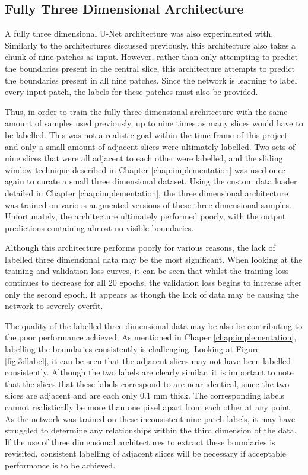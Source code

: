 \subsection{Fully Three Dimensional Architecture}
\label{sec:eval3darch}

A fully three dimensional U-Net architecture was also experimented with. Similarly to the architectures discussed previously, this architecture also takes a chunk of nine patches as input. However, rather than only attempting to predict the boundaries present in the central slice, this architecture attempts to predict the boundaries present in all nine patches. Since the network is learning to label every input patch, the labels for these patches must also be provided.

Thus, in order to train the fully three dimensional architecture with the same amount of samples used previously, up to nine times as many slices would have to be labelled. This was not a realistic goal within the time frame of this project and only a small amount of adjacent slices were ultimately labelled. Two sets of nine slices that were all adjacent to each other were labelled, and the sliding window technique described in Chapter \ref{chap:implementation} was used once again to curate a small three dimensional dataset. Using the custom data loader detailed in Chapter \ref{chap:implementation}, the three dimensional architecture was trained on various augmented versions of these three dimensional samples. Unfortunately, the architecture ultimately performed poorly, with the output predictions containing almost no visible boundaries.

Although this architecture performs poorly for various reasons, the lack of labelled three dimensional data may be the most significant. When looking at the training and validation loss curves, it can be seen that whilst the training loss continues to decrease for all 20 epochs, the validation loss begins to increase after only the second epoch. It appears as though the lack of data may be causing the network to severely overfit.

The quality of the labelled three dimensional data may be also be contributing to the poor performance achieved. As mentioned in Chaper \ref{chap:implementation}, labelling the boundaries consistently is challenging. Looking at Figure \ref{fig:3dlabel}, it can be seen that the adjacent slices may not have been labelled consistently. Although the two labels are clearly similar, it is important to note that the slices that these labels correspond to are near identical, since the two slices are adjacent and are each only 0.1 mm thick. The corresponding labels cannot realistically be more than one pixel apart from each other at any point. As the network was trained on these inconsistent nine-patch labels, it may have struggled to determine any relationships within the third dimension of the data. If the use of three dimensional architectures to extract these boundaries is revisited, consistent labelling of adjacent slices will be necessary if acceptable performance is to be achieved.

